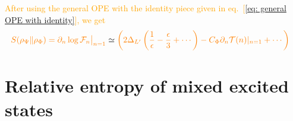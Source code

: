 \documentclass[11pt]{article}
\newcommand{\ep}{\epsilon}
\newcommand{\p}{\partial}
\newcommand{\mO}{\mathcal{O}}
\newcommand{\nn}{\nonumber}
\newcommand{\lb}{\left(}
\newcommand{\rb}{\right)}
\newcommand{\JM}[1]{\textcolor{orange}{#1}}
\begin{document}
\JM{After using the general OPE with the identity piece given in eq.~[\ref{eq: general OPE with identity}], we get}
\begin{align}
    \JM{S(\rho_\Psi \| \rho_\Phi) = \p_n \log \mathcal{F}_n \big|_{n=1}} & \simeq  \JM{
    \lb 2\Delta_{L'}\lb  \frac{1}{\ep} - \frac{\ep}{3} + \cdots
    \rb  - C_\Phi  \p_n \mathcal{T}(n)|_{n=1} + \cdots \rb }
\end{align}




  \section{Relative entropy of mixed excited states}

  
\end{document}
